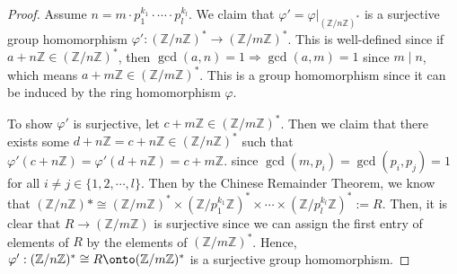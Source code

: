 \begin{answer}
\begin{proof}
        Assume $n = m\cdot p_1^{k_1}\cdot \cdots \cdot p_l^{k_l}$. We claim that $\varphi' = \varphi\vert_{(\mathbb{Z}/n\mathbb{Z})^*}$ is a surjective group homomorphism $\varphi': (\mathbb{Z}/n\mathbb{Z})^* \to (\mathbb{Z}/m\mathbb{Z})^*$. This is well-defined since if $a + n\mathbb{Z} \in (\mathbb{Z}/n\mathbb{Z})^*$, then $\gcd(a,n) = 1 \Rightarrow \gcd(a,m) = 1$ since $m \mid n$, which means $a+m\mathbb{Z} \in (\mathbb{Z}/m\mathbb{Z})^*$. This is a group homomorphism since it can be induced by the ring homomorphism $\varphi$.
        
        To show $\varphi'$ is surjective, let $c + m\mathbb{Z} \in (\mathbb{Z}/m\mathbb{Z})^*$. Then we claim that there exists some $d + n\mathbb{Z} = c + n\mathbb{Z} \in (\mathbb{Z}/n\mathbb{Z})^*$ such that $\varphi'(c + n\mathbb{Z}) = \varphi'(d + n\mathbb{Z}) = c + m\mathbb{Z}$. since $\gcd(m,p_i) = \gcd(p_i,p_j) = 1$ for all $i \neq j \in \{1,2,\cdots,l\}$. Then by the Chinese Remainder Theorem, we know that $(\mathbb{Z}/n\mathbb{Z})* \cong (\mathbb{Z}/m\mathbb{Z})^* \times (\mathbb{Z}/p_1^{k_1}\mathbb{Z})^* \times \cdots \times (\mathbb{Z}/p_l^{k_l}\mathbb{Z})^* := R$. Then, it is clear that $R \to (\mathbb{Z}/m\mathbb{Z})$ is surjective since we can assign the first entry of elements of $R$ by the elements of $(\mathbb{Z}/m\mathbb{Z})^*$. Hence, $\varphi': (\mathbb{Z}/n\mathbb{Z})^* \cong R \onto (\mathbb{Z}/m\mathbb{Z})^*$ is a surjective group homomorphism.
    \end{proof}
\end{answer}